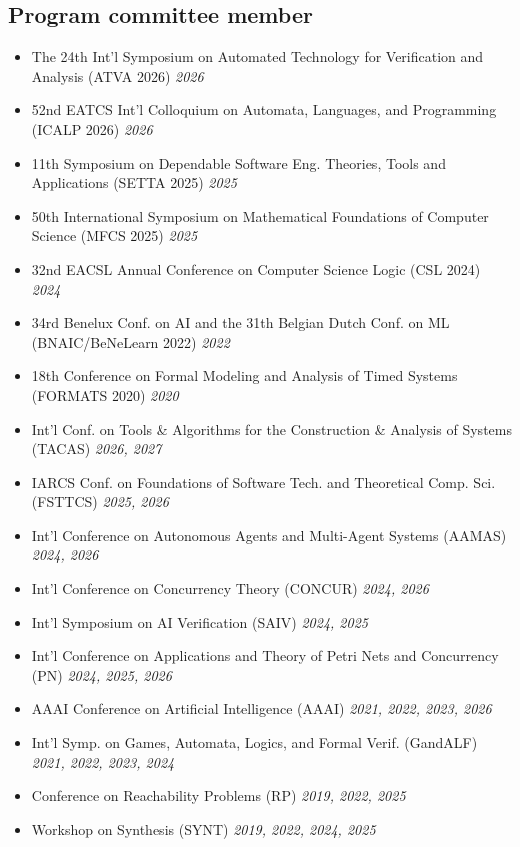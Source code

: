 \documentclass[10pt,a4paper]{moderncv}
\begin{document}
\subsection{Program committee member}
\begin{itemize}
  \item The 24th Int'l Symposium on Automated
    Technology for Verification and Analysis (ATVA 2026) \hfill \textit{2026}
  \item 52nd EATCS Int'l Colloquium on Automata, Languages, and
    Programming (ICALP 2026) \hfill \textit{2026}
  \item 11th Symposium on Dependable Software Eng. Theories, Tools and
    Applications (SETTA 2025) \hfill \textit{2025}
  \item 50th International Symposium on Mathematical Foundations of Computer
    Science (MFCS 2025) \hfill \textit{2025}
  \item 32nd EACSL Annual Conference on Computer Science Logic (CSL 2024)
    \hfill \textit{2024}
  \item 34rd Benelux Conf. on AI and the 31th
    Belgian Dutch Conf. on ML (BNAIC/BeNeLearn 2022) \hfill \textit{2022}
  \item 18th Conference on Formal Modeling and Analysis of Timed
    Systems (FORMATS 2020) \hfill \textit{2020}
  \item Int'l Conf. on Tools \& Algorithms for the
    Construction \& Analysis of Systems (TACAS) \hfill \textit{2026, 2027}
  \item IARCS Conf. on Foundations of Software Tech. and
    Theoretical Comp. Sci. (FSTTCS) \hfill \textit{2025, 2026}
  \item Int'l Conference on Autonomous Agents and Multi-Agent
    Systems (AAMAS) \hfill \textit{2024, 2026}
  \item Int'l Conference on Concurrency Theory (CONCUR) \hfill
    \textit{2024, 2026}
  \item Int'l Symposium on AI Verification (SAIV) \hfill
    \textit{2024, 2025}
  \item Int'l Conference on Applications and Theory of Petri Nets
    and Concurrency (PN) \hfill \textit{2024, 2025, 2026}
  \item AAAI Conference on Artificial Intelligence (AAAI) \hfill
    \textit{2021, 2022, 2023, 2026}
  \item Int'l Symp. on Games, Automata, Logics, and Formal
    Verif. (GandALF) \hfill \textit{2021, 2022, 2023, 2024}
  \item Conference on Reachability Problems (RP) \hfill \textit{2019, 2022,
    2025}
  \item Workshop on Synthesis (SYNT) \hfill \textit{2019, 2022, 2024, 2025}
\end{itemize}
\end{document}
